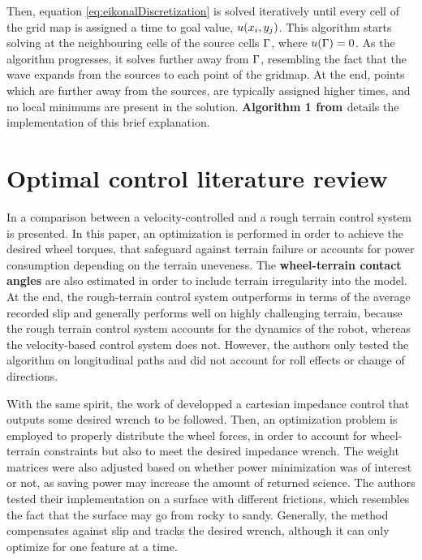 Then, equation \eqref{eq:eikonalDiscretization} is solved iteratively until every cell of the grid map is assigned a time to goal value, $u(x_i, y_j)$. This algorithm starts solving  at the neighbouring cells of the source cells $\Gamma$, where $u(\Gamma) = 0$. As the algorithm progresses, it solves  further away from $\Gamma$, resembling the fact that the wave expands from the sources to each point of the gridmap. At the end, points which are further away from the sources, are typically assigned higher times, and no local minimums are present in the solution. \textbf{Algorithm 1 from \cite{fmAdvancedGomez}} details the implementation of this brief explanation.

\section{Optimal control literature review}
\label{section:ocpRoughTerrain}

In \cite{IagnemmaDubowsy2004} a comparison between a velocity-controlled and a rough terrain control system is presented. In this paper, an optimization is performed in order to achieve the desired wheel torques, that safeguard against terrain failure or accounts for power consumption depending on the terrain uneveness. The \textbf{wheel-terrain contact angles} are also estimated in order to include terrain irregularity into the model. At the end, the rough-terrain control system outperforms in terms of the average recorded slip and generally performs well on highly challenging terrain, because the rough terrain control system accounts for the dynamics of the robot, whereas the velocity-based control system does not. However, the authors only tested the algorithm on longitudinal paths and did not account for roll effects or change of directions.

With the same spirit, the work of \citet{bussmannPlanetaryRoverImpedanceControl} developped a cartesian impedance control that outputs some desired wrench to be followed. Then, an optimization problem is employed to properly distribute the wheel forces, in order to account for wheel-terrain constraints but also to meet the desired impedance wrench. The weight matrices were also adjusted based on whether power minimization was of interest or not, as saving power may increase the amount of returned science. The authors tested their implementation on a surface with different frictions, which resembles the fact that the surface may go from rocky to sandy. Generally, the method compensates against slip and tracks the desired wrench, although it can only optimize for one feature at a time.

